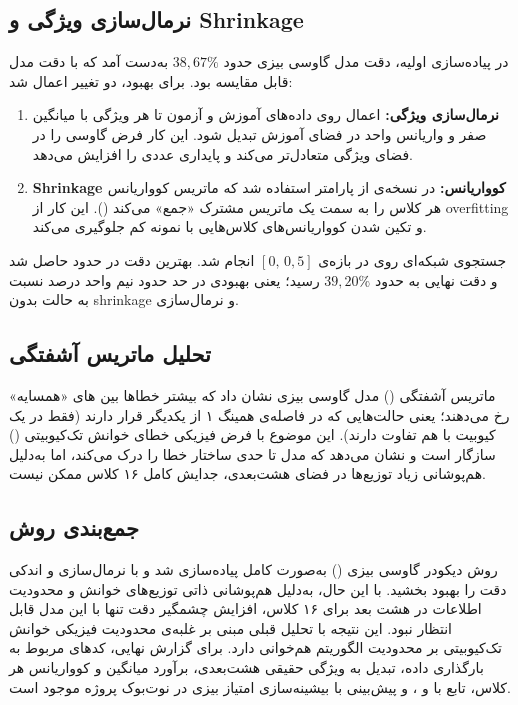 \subsection{نرمال‌سازی ویژگی و Shrinkage}
در پیاده‌سازی اولیه، دقت مدل گاوسی بیزی حدود $38{,}67\%$ به‌دست آمد که با دقت مدل  قابل مقایسه بود. برای بهبود، دو تغییر اعمال شد:
\begin{enumerate}
	\item \textbf{نرمال‌سازی ویژگی:} اعمال  روی داده‌های آموزش و آزمون تا هر ویژگی با میانگین صفر و واریانس واحد در فضای آموزش تبدیل شود. این کار فرض گاوسی را در فضای ویژگی متعادل‌تر می‌کند و پایداری عددی را افزایش می‌دهد.
	\item \textbf{Shrinkage کوواریانس:} در نسخه‌ی  از پارامتر  استفاده شد که ماتریس کوواریانس هر کلاس را به سمت یک ماتریس مشترک «جمع» می‌کند (). این کار از overfitting و تکین شدن کوواریانس‌های کلاس‌هایی با نمونه کم جلوگیری می‌کند.
\end{enumerate}
جستجوی شبکه‌ای روی  در بازه‌ی $[0,\, 0{,}5]$ انجام شد. بهترین دقت در حدود  حاصل شد و دقت نهایی به حدود $39{,}20\%$ رسید؛ یعنی بهبودی در حد حدود نیم واحد درصد نسبت به حالت بدون shrinkage و نرمال‌سازی.

\subsection{تحلیل ماتریس آشفتگی}
ماتریس آشفتگی () مدل گاوسی بیزی نشان داد که بیشتر خطاها بین های «همسایه» رخ می‌دهند؛ یعنی حالت‌هایی که در فاصله‌ی همینگ ۱ از یکدیگر قرار دارند (فقط در یک کیوبیت با هم تفاوت دارند). این موضوع با فرض فیزیکی خطای خوانش تک‌کیوبیتی () سازگار است و نشان می‌دهد که مدل تا حدی ساختار خطا را درک می‌کند، اما به‌دلیل هم‌پوشانی زیاد توزیع‌ها در فضای هشت‌بعدی، جدایش کامل ۱۶ کلاس ممکن نیست.

\subsection{جمع‌بندی روش}
روش دیکودر گاوسی بیزی () به‌صورت کامل پیاده‌سازی شد و با نرمال‌سازی و  اندکی دقت را بهبود بخشید. با این حال، به‌دلیل هم‌پوشانی ذاتی توزیع‌های خوانش و محدودیت اطلاعات در هشت بعد برای ۱۶ کلاس، افزایش چشمگیر دقت تنها با این مدل قابل انتظار نبود. این نتیجه با تحلیل قبلی مبنی بر غلبه‌ی محدودیت فیزیکی خوانش تک‌کیوبیتی بر محدودیت الگوریتم هم‌خوانی دارد. برای گزارش نهایی، کدهای مربوط به بارگذاری داده، تبدیل به ویژگی حقیقی هشت‌بعدی، برآورد میانگین و کوواریانس هر کلاس، تابع  با  و ، و پیش‌بینی با بیشینه‌سازی امتیاز بیزی در نوت‌بوک پروژه موجود است.


